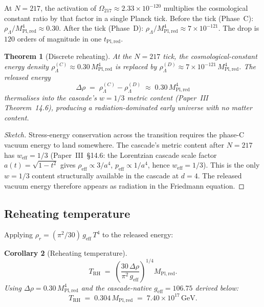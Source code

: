 \documentclass[12pt,a4paper]{article}
\newtheorem{theorem}{Theorem}[section]
\newtheorem{corollary}[theorem]{Corollary}
\begin{document}
At $N = 217$, the activation of $\Omega_{217} \approx 2.33 \times 10^{-120}$
multiplies the cosmological constant ratio by that factor in a single Planck
tick. Before the tick (Phase~C): $\rho_\Lambda / M_{\mathrm{Pl,red}}^4 \approx
0.30$. After the tick (Phase~D): $\rho_\Lambda / M_{\mathrm{Pl,red}}^4 \approx
7 \times 10^{-121}$. The drop is $120$ orders of magnitude in one
$t_{\mathrm{Pl,red}}$.

\begin{theorem}[Discrete reheating]\label{thm:reheating}
At the $N = 217$ tick, the cosmological-constant energy density
$\rho_\Lambda^{(C)} \approx 0.30\,M_{\mathrm{Pl,red}}^4$ is replaced by
$\rho_\Lambda^{(D)} \approx 7 \times 10^{-121}\,M_{\mathrm{Pl,red}}^4$. The
released energy
\[
\Delta\rho \;=\; \rho_\Lambda^{(C)} - \rho_\Lambda^{(D)}
\;\approx\; 0.30\,M_{\mathrm{Pl,red}}^4
\]
thermalises into the cascade's $w = 1/3$ metric content (Paper~III~\cite{part3}
Theorem~14.6), producing a radiation-dominated early universe with no matter
content.
\end{theorem}

\begin{proof}[Sketch]
Stress-energy conservation across the transition requires the phase-C vacuum
energy to land somewhere. The cascade's metric content after $N = 217$ has
$w_{\mathrm{eff}} = 1/3$ (Paper~III~\S14.6: the Lorentzian cascade scale factor
$a(t) = \sqrt{1 - t^2}$ gives $\rho_{\mathrm{eff}} \propto 3/a^4$,
$p_{\mathrm{eff}} \propto 1/a^4$, hence $w_{\mathrm{eff}} = 1/3$). This is the
only $w = 1/3$ content structurally available in the cascade at $d = 4$. The
released vacuum energy therefore appears as radiation in the Friedmann
equation.
\end{proof}

\subsection{Reheating temperature}

Applying $\rho_r = (\pi^2/30)\,g_{\mathrm{eff}}\,T^4$ to the released energy:

\begin{corollary}[Reheating temperature]\label{cor:TRH}
\[
T_{\mathrm{RH}} \;=\; \left(\frac{30\,\Delta\rho}{\pi^2\,g_{\mathrm{eff}}}\right)^{1/4}
M_{\mathrm{Pl,red}}.
\]
Using $\Delta\rho = 0.30\,M_{\mathrm{Pl,red}}^4$ and the cascade-native
$g_{\mathrm{eff}} = 106.75$ derived below:
\[
T_{\mathrm{RH}} \;=\; 0.304\,M_{\mathrm{Pl,red}} \;=\; 7.40 \times 10^{17}\,\mathrm{GeV}.
\]
\end{corollary}
\end{document}
